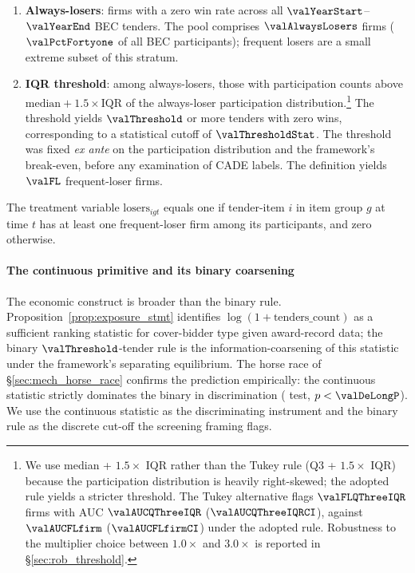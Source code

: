 \begin{enumerate}
\item \textbf{Always-losers}: firms with a zero win rate across
all $\valYearStart$--$\valYearEnd$ BEC tenders. The pool
comprises $\valAlwaysLosers$ firms ($\valPctFortyone$ of all BEC
participants); frequent losers are a small extreme subset of
this stratum.
\item \textbf{IQR threshold}: among always-losers, those with
participation counts above $\text{median}+1.5\!\times\!\text{IQR}$
of the always-loser participation
distribution.\footnote{We use median + $1.5\!\times$ IQR rather
than the Tukey rule (Q3 + $1.5\!\times$ IQR) because the
participation distribution is heavily right-skewed; the adopted
rule yields a stricter threshold. The Tukey alternative flags
$\valFLQThreeIQR$ firms with AUC $\valAUCQThreeIQR$
($\valAUCQThreeIQRCI$), against $\valAUCFLfirm$
($\valAUCFLfirmCI$) under the adopted rule. Robustness to the
multiplier choice between $1.0\!\!\times$ and $3.0\!\!\times$ is
reported in §\ref{sec:rob_threshold}.} The threshold yields
$\valThreshold$ or more tenders with zero wins, corresponding
to a statistical cutoff of $\valThresholdStat$. The threshold
was fixed \emph{ex ante} on the participation distribution and
the framework's break-even, before any examination of CADE
labels. The definition yields $\valFL$ frequent-loser firms.
\end{enumerate}

The treatment variable $\text{losers}_{igt}$ equals one if
tender-item $i$ in item group $g$ at time $t$ has at least one
frequent-loser firm among its participants, and zero otherwise.

\paragraph{The continuous primitive and its binary coarsening}
The economic construct is broader than the binary rule.
Proposition~\ref{prop:exposure_stmt} identifies
$\log(1+\text{tenders\_count})$ as a sufficient ranking statistic
for cover-bidder type given award-record data; the binary
$\valThreshold$-tender rule is the information-coarsening of
this statistic under the framework's separating equilibrium. The
horse race of §\ref{sec:mech_horse_race} confirms the prediction
empirically: the continuous statistic strictly dominates the
binary in discrimination
(\citealt{delong1988comparing} test, $p < \valDeLongP$). We use
the continuous statistic as the discriminating instrument and
the binary rule as the discrete cut-off the screening framing
flags.

